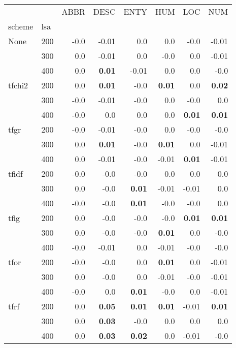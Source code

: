 \begin{table}[h]
\begin{center}

\begin{tabular}{ll|rrrrrr}
\toprule
   &   & ABBR & DESC & ENTY & HUM & LOC & NUM \\
scheme & lsa &         &         &         &         &         &         \\
\midrule
None & 200 &       -0.0 &      -0.01 &       0.0 &       0.0 &      -0.0 &      -0.01 \\
   & 300 &       0.0 &      -0.01 &       0.0 &      -0.0 &       0.0 &      -0.01 \\
   & 400 &       0.0 &  \textbf{0.01} &      -0.01 &       0.0 &       0.0 &      -0.0 \\
tfchi2 & 200 &       0.0 &  \textbf{0.01} &       -0.0 &  \textbf{0.01} &       0.0 &  \textbf{0.02} \\
   & 300 &       -0.0 &      -0.01 &       -0.0 &       0.0 &      -0.0 &       0.0 \\
   & 400 &       -0.0 &       0.0 &       0.0 &       0.0 &  \textbf{0.01} &  \textbf{0.01} \\
tfgr & 200 &       -0.0 &      -0.01 &       -0.0 &       0.0 &      -0.0 &      -0.0 \\
   & 300 &       0.0 &  \textbf{0.01} &       -0.0 &  \textbf{0.01} &       0.0 &      -0.01 \\
   & 400 &       0.0 &      -0.01 &       -0.0 &      -0.01 &  \textbf{0.01} &      -0.01 \\
tfidf & 200 &       -0.0 &       -0.0 &       -0.0 &       0.0 &       0.0 &       0.0 \\
   & 300 &       0.0 &       -0.0 &  \textbf{0.01} &      -0.01 &      -0.01 &       0.0 \\
   & 400 &       -0.0 &       -0.0 &  \textbf{0.01} &      -0.0 &      -0.0 &       0.0 \\
tfig & 200 &       0.0 &       -0.0 &       -0.0 &      -0.0 &  \textbf{0.01} &  \textbf{0.01} \\
   & 300 &       0.0 &       -0.0 &       -0.0 &  \textbf{0.01} &       0.0 &      -0.0 \\
   & 400 &       -0.0 &      -0.01 &       0.0 &      -0.01 &      -0.0 &      -0.0 \\
tfor & 200 &       -0.0 &       -0.0 &       0.0 &  \textbf{0.01} &       0.0 &      -0.01 \\
   & 300 &       0.0 &       -0.0 &       0.0 &      -0.01 &      -0.0 &      -0.01 \\
   & 400 &       -0.0 &       0.0 &  \textbf{0.01} &      -0.0 &       0.0 &      -0.01 \\
tfrf & 200 &       0.0 &  \textbf{0.05} &  \textbf{0.01} &  \textbf{0.01} &      -0.01 &  \textbf{0.01} \\
   & 300 &       0.0 &  \textbf{0.03} &       -0.0 &       0.0 &       0.0 &       0.0 \\
   & 400 &       0.0 &  \textbf{0.03} &  \textbf{0.02} &       0.0 &      -0.01 &      -0.0 \\
\bottomrule
\end{tabular}


\end{center}
\end{table}
